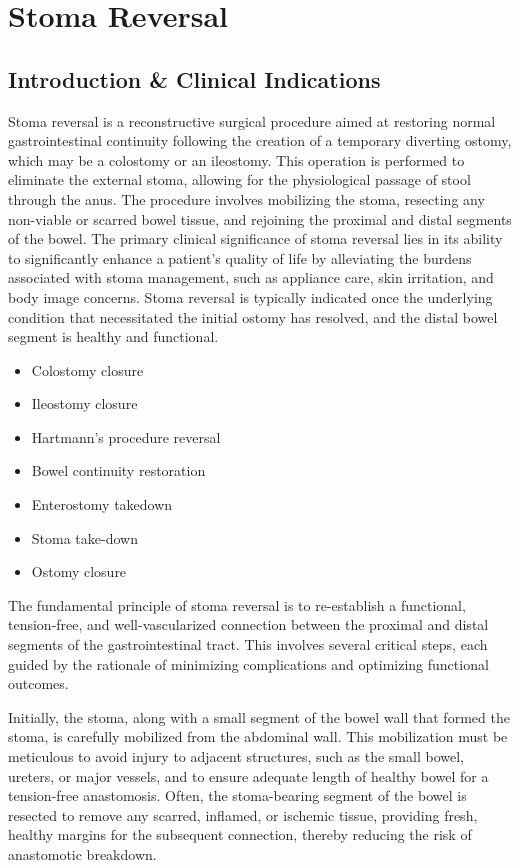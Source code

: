 \chapter{Stoma Reversal}

\section*{Introduction \& Clinical Indications}
Stoma reversal is a reconstructive surgical procedure aimed at restoring normal gastrointestinal continuity following the creation of a temporary diverting ostomy, which may be a colostomy or an ileostomy. This operation is performed to eliminate the external stoma, allowing for the physiological passage of stool through the anus. The procedure involves mobilizing the stoma, resecting any non-viable or scarred bowel tissue, and rejoining the proximal and distal segments of the bowel. The primary clinical significance of stoma reversal lies in its ability to significantly enhance a patient's quality of life by alleviating the burdens associated with stoma management, such as appliance care, skin irritation, and body image concerns. Stoma reversal is typically indicated once the underlying condition that necessitated the initial ostomy has resolved, and the distal bowel segment is healthy and functional.

\begin{itemize}
  \item Colostomy closure
  \item Ileostomy closure
  \item Hartmann's procedure reversal
  \item Bowel continuity restoration
  \item Enterostomy takedown
  \item Stoma take-down
  \item Ostomy closure
\end{itemize}

The fundamental principle of stoma reversal is to re-establish a functional, tension-free, and well-vascularized connection between the proximal and distal segments of the gastrointestinal tract. This involves several critical steps, each guided by the rationale of minimizing complications and optimizing functional outcomes. 

Initially, the stoma, along with a small segment of the bowel wall that formed the stoma, is carefully mobilized from the abdominal wall. This mobilization must be meticulous to avoid injury to adjacent structures, such as the small bowel, ureters, or major vessels, and to ensure adequate length of healthy bowel for a tension-free anastomosis. Often, the stoma-bearing segment of the bowel is resected to remove any scarred, inflamed, or ischemic tissue, providing fresh, healthy margins for the subsequent connection, thereby reducing the risk of anastomotic breakdown.

